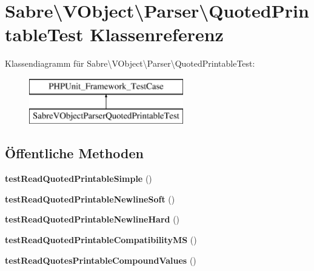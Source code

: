 \hypertarget{class_sabre_1_1_v_object_1_1_parser_1_1_quoted_printable_test}{}\section{Sabre\textbackslash{}V\+Object\textbackslash{}Parser\textbackslash{}Quoted\+Printable\+Test Klassenreferenz}
\label{class_sabre_1_1_v_object_1_1_parser_1_1_quoted_printable_test}
Klassendiagramm für Sabre\textbackslash{}V\+Object\textbackslash{}Parser\textbackslash{}Quoted\+Printable\+Test\+:\begin{figure}[H]
\begin{center}
\leavevmode
\includegraphics[height=2.000000cm]{class_sabre_1_1_v_object_1_1_parser_1_1_quoted_printable_test}
\end{center}
\end{figure}
\subsection*{Öffentliche Methoden}
\begin{DoxyCompactItemize}
\item 
\mbox{\label{class_sabre_1_1_v_object_1_1_parser_1_1_quoted_printable_test_a47b53726c07e7f9de72aa3b0ac947174}} 
{\bfseries test\+Read\+Quoted\+Printable\+Simple} ()
\item 
\mbox{\label{class_sabre_1_1_v_object_1_1_parser_1_1_quoted_printable_test_a6501d7b051bc81e974819f43e9c17043}} 
{\bfseries test\+Read\+Quoted\+Printable\+Newline\+Soft} ()
\item 
\mbox{\label{class_sabre_1_1_v_object_1_1_parser_1_1_quoted_printable_test_ab9a61928230dbe012b50ad1b6eea3d5f}} 
{\bfseries test\+Read\+Quoted\+Printable\+Newline\+Hard} ()
\item 
\mbox{\label{class_sabre_1_1_v_object_1_1_parser_1_1_quoted_printable_test_aa8df21aef693cfb5d7ea53f9dedb5f6f}} 
{\bfseries test\+Read\+Quoted\+Printable\+Compatibility\+MS} ()
\item 
\mbox{\label{class_sabre_1_1_v_object_1_1_parser_1_1_quoted_printable_test_a46de41f67f127fa7ef3c01a11f4e177d}} 
{\bfseries test\+Read\+Quotes\+Printable\+Compound\+Values} ()
\end{DoxyCompactItemize}


